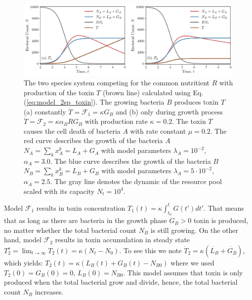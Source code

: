 \documentclass[10pt,A4paper]{article}
\begin{document}
\begin{figure}[H]
    \begin{center}
    \includegraphics[width=1.\textwidth]{Figures/pool_model_2pools_toxin.pdf}
    \caption{
        The two species system competing for the common nutritient $R$ with production of the toxin $T$ (brown line) calculated using Eq. (\ref{eq:model_2sp_toxin}).
        The growing bacteria $B$ produces toxin $T$ (a) constantly $\dot{T} = \mathcal{F}_1 = \kappa G_B$ and (b) only during growth process $\dot{T} = \mathcal{F}_2 = \kappa \alpha_B R G_B$ with 
        production rate $\kappa=0.2$.
        The toxin $T$ causes the cell death of bacteria $A$ with rate constant $\mu = 0.2$.
        The red curve describes the growth of the bacteria $A$ $N_A = \sum_{k} x_A^k = L_A+G_A$ with model parameters $\lambda_A=10^{-2}$, $\alpha_A=3.0$.
        The blue curve describes the growth of the bacteria $B$ $N_B = \sum_{k} x_B^k = L_B+G_B$ with model parameters $\lambda_A=5\cdot 10^{-2}$, $\alpha_A=2.5$.
        The gray line denotes the dynamic of the resource pool scaled with its capacity $N_t=10^4$.
    }
    \label{fig:2pool_2sp_toxin}
    \end{center}
\end{figure}
%
Model $\mathcal{F}_1$ results in toxin concentration $T_1(t)=\kappa\int_{t_0}^tG(t')dt'$.
That means that as long as there are bacteria in the growth phase $G_B>0$ toxin is produced, no matter whether the total bacterial count $N_B$ is still growing. 
On the other hand, model $\mathcal{F}_2$ results in toxin accumulation in steady state $T_2^s=\lim_{t\to\infty}T_2(t)=\kappa(N_t-N_0)$. 
To see this we note $\dot{T}_2=\kappa(\dot{L_B}+\dot{G_B})$, which yields: $T_2(t)=\kappa(L_B(t)+G_B(t)-N_{B0})$ where we used $T_2(0)=G_B(0)=0$, $L_B(0)=N_{B0}$. 
This model assumes that toxin is only produced when the total bacterial grow and divide, hence, the total bacterial count $N_B$ increases.\\
%
%
\end{document}

